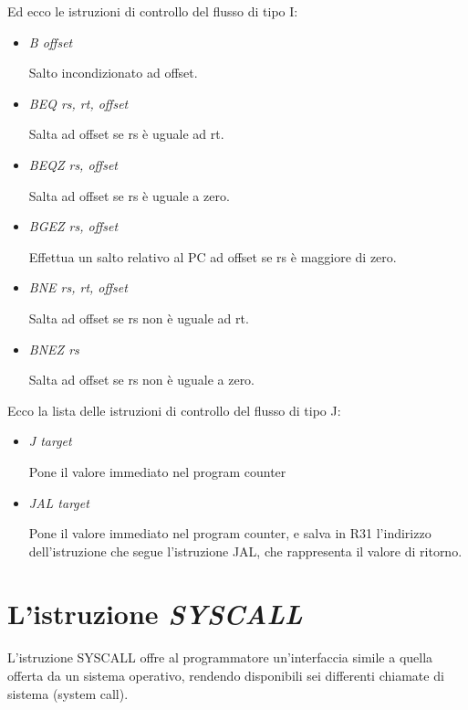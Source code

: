 \documentclass[letterpaper,10pt,italian]{sphinxmanual}
\begin{document}
Ed ecco le istruzioni di controllo del flusso di tipo I:
\begin{itemize}
\item {} 
\emph{B offset}

Salto incondizionato ad offset.

\item {} 
\emph{BEQ rs, rt, offset}

Salta ad offset se rs è uguale ad rt.

\item {} 
\emph{BEQZ rs, offset}

Salta ad offset se rs è uguale a zero.

\end{itemize}
\begin{itemize}
\item {} 
\emph{BGEZ rs, offset}

Effettua un salto relativo al PC ad offset se rs è maggiore di zero.

\item {} 
\emph{BNE rs, rt, offset}

Salta ad offset se rs non è uguale ad rt.

\item {} 
\emph{BNEZ rs}

Salta ad offset se rs non è uguale a zero.

\end{itemize}

Ecco la lista delle istruzioni di controllo del flusso di tipo J:
\begin{itemize}
\item {} 
\emph{J target}

Pone il valore immediato nel program counter

\item {} 
\emph{JAL target}

Pone il valore immediato nel program counter, e salva in R31 l'indirizzo
dell'istruzione che segue l'istruzione JAL, che rappresenta il valore di
ritorno.

\end{itemize}


\section{L'istruzione \emph{SYSCALL}}
\label{instructions:l-istruzione-syscall}
L'istruzione SYSCALL offre al programmatore un'interfaccia simile a quella
offerta da un sistema operativo, rendendo disponibili sei differenti chiamate
di sistema (system call).
\end{document}
